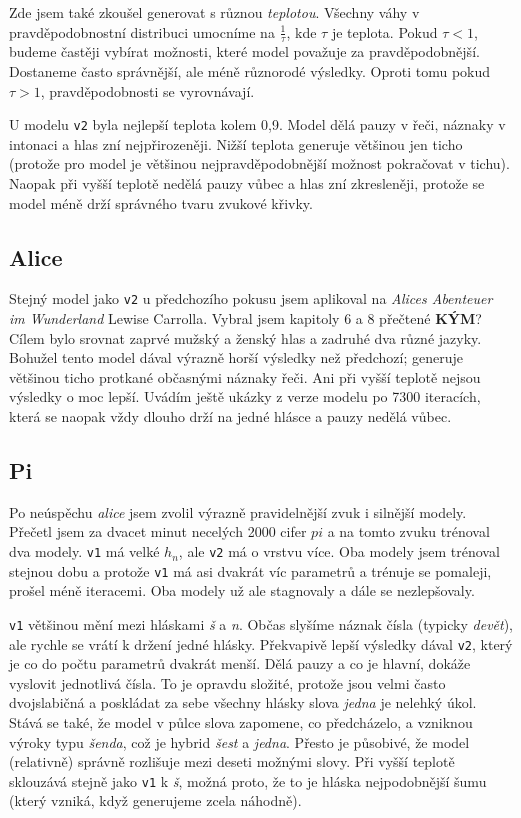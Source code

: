 \documentclass[a4]{article}
\begin{document}
Zde jsem také zkoušel generovat s různou \textit{teplotou}. Všechny váhy v pravděpodobnostní distribuci umocníme na $\frac{1}{\tau}$, kde $\tau$ je teplota. Pokud $\tau<1$, budeme častěji vybírat možnosti, které model považuje za pravděpodobnější. Dostaneme často správnější, ale méně různorodé výsledky. Oproti tomu pokud $\tau > 1$, pravděpodobnosti se vyrovnávají.

U modelu \verb|v2| byla nejlepší teplota kolem 0,9. Model dělá pauzy v řeči, náznaky v intonaci a hlas zní nejpřirozeněji. Nižší teplota generuje většinou jen ticho (protože pro model je většinou nejpravděpodobnější možnost pokračovat v tichu). Naopak při vyšší teplotě nedělá pauzy vůbec a hlas zní zkresleněji, protože se model méně drží správného tvaru zvukové křivky.

\subsection{Alice}
Stejný model jako \verb|v2| u předchozího pokusu jsem aplikoval na \textit{Alices Abenteuer im Wunderland} Lewise Carrolla. Vybral jsem kapitoly 6 a 8 přečtené \textbf{KÝM}? Cílem bylo srovnat zaprvé mužský a ženský hlas a zadruhé dva různé jazyky. Bohužel tento model dával výrazně horší výsledky než předchozí; generuje většinou ticho protkané občasnými náznaky řeči. Ani při vyšší teplotě nejsou výsledky o moc lepší. Uvádím ještě ukázky z verze modelu po 7300 iteracích, která se naopak vždy dlouho drží na jedné hlásce a pauzy nedělá vůbec.

\subsection{Pi}
Po neúspěchu \textit{alice} jsem zvolil výrazně pravidelnější zvuk i silnější modely. Přečetl jsem za dvacet minut necelých 2000 cifer $pi$ a na tomto zvuku trénoval dva modely. \verb|v1| má velké $h_n$, ale \verb|v2| má o vrstvu více. Oba modely jsem trénoval stejnou dobu a protože \verb|v1| má asi dvakrát víc parametrů a trénuje se pomaleji, prošel méně iteracemi. Oba modely už ale stagnovaly a dále se nezlepšovaly.

\verb|v1| většinou mění mezi hláskami \textit{š} a \textit{n}. Občas slyšíme náznak čísla (typicky \textit{devět}), ale rychle se vrátí k držení jedné hlásky.
Překvapivě lepší výsledky dával \verb|v2|, který je co do počtu parametrů dvakrát menší. Dělá pauzy a co je hlavní, dokáže vyslovit jednotlivá čísla. To je opravdu složité, protože jsou velmi často dvojslabičná a poskládat za sebe všechny hlásky slova \textit{jedna} je nelehký úkol. Stává se také, že model v půlce slova zapomene, co předcházelo, a vzniknou výroky typu \textit{šenda}, což je hybrid \textit{šest} a \textit{jedna}. Přesto je působivé, že model (relativně) správně rozlišuje mezi deseti možnými slovy.
Při vyšší teplotě sklouzává stejně jako \verb|v1| k \textit{š}, možná proto, že to je hláska nejpodobnější šumu (který vzniká, když generujeme zcela náhodně).
\end{document}
